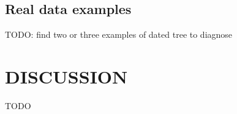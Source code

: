 \documentclass{article}
\begin{document}
\subsection*{Real data examples}

TODO: find two or three examples of dated tree to diagnose

\section*{DISCUSSION}

TODO 

%
\end{document}
